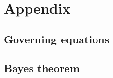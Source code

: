\documentclass[a4paper,fleqn]{cas-dc}
\begin{document}
\clearpage
%



\clearpage \appendix \label{appendix}
\section{Appendix} 
\subsection{Governing equations}


\subsection{Bayes theorem} \label{CH: Bayes}

\end{document}
